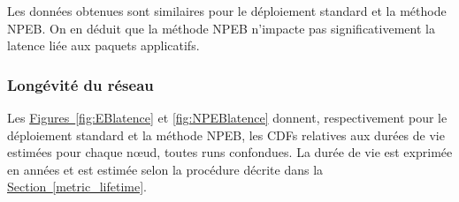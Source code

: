 \documentclass[]{report}
\newcommand{\wordlink}[2]{\hyperref[#2]{#1~\ref{#2}}}
\begin{document}
Les données obtenues sont similaires pour le déploiement standard et la méthode NPEB. On en déduit que la méthode NPEB n'impacte pas significativement la latence liée aux paquets applicatifs.

\newpage

\subsubsection{Longévité du réseau}
\label{results_lifetime}

Les \wordlink{Figures}{fig:EBlatence} et \ref{fig:NPEBlatence} donnent,  respectivement pour le déploiement standard et la méthode NPEB, les CDFs relatives aux durées de vie estimées pour chaque nœud, toutes runs confondues. La durée de vie est exprimée en années et est estimée selon la procédure décrite dans la \wordlink{Section}{metric_lifetime}.

\vspace{0.2cm}
\end{document}
